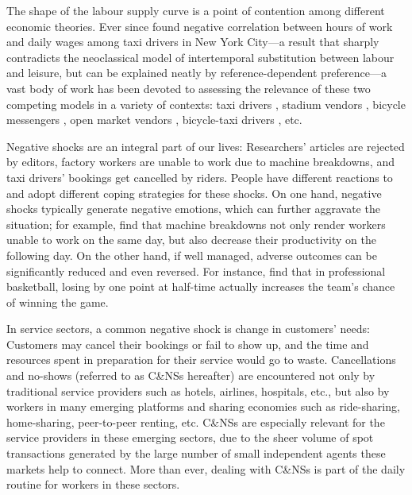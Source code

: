\documentclass[reviewmode]{AEA}
\begin{document}
The shape of the labour supply curve is a point of contention among different economic theories. Ever since \citet{camerer1997labor} found negative correlation between hours of work and daily wages among taxi drivers in New York City---a result that sharply contradicts the neoclassical model of intertemporal substitution between labour and leisure, but can be explained neatly by reference-dependent preference---a vast body of work has been devoted to assessing the relevance of these two competing models in a variety of contexts: taxi drivers \citep{farber2005tomorrow,farber2008reference,farber2015you,crawford2011new,agarwal2015singaporean,martin2017quit,thakral2018daily}, stadium vendors \citep{oettinger1999empirical}, bicycle messengers \citep{fehr2007do}, open market vendors \citep{andersen2014toward}, bicycle-taxi drivers \citep{dupas2018daily}, etc.





Negative shocks are an integral part of our lives: Researchers' articles are rejected by editors, factory workers are unable to work due to machine breakdowns, and taxi drivers' bookings get cancelled by riders. People have different reactions to and adopt different coping strategies for these shocks. On one hand, negative shocks typically generate negative emotions, which can further aggravate the situation; for example, \citet{cai2017recover} find that machine breakdowns not only render workers unable to work on the same day, but also decrease their productivity on the following day. On the other hand, if well managed, adverse outcomes can be significantly reduced and even reversed. For instance, \citet{berger2011can} find that in professional basketball, losing by one point at half-time actually increases the team's chance of winning the game.

In service sectors, a common negative shock is change in customers' needs: Customers may cancel their bookings or fail to show up, and the time and resources spent in preparation for their service would go to waste. Cancellations and no-shows (referred to as C\&NSs hereafter) are encountered not only by traditional service providers such as hotels, airlines, hospitals, etc., but also by workers in many emerging platforms and sharing economies such as ride-sharing, home-sharing, peer-to-peer renting, etc. C\&NSs are especially relevant for the service providers in these emerging sectors, due to the sheer volume of spot transactions generated by the large number of small independent agents these markets help to connect. More than ever, dealing with C\&NSs is part of the daily routine for workers in these sectors.
\end{document}
